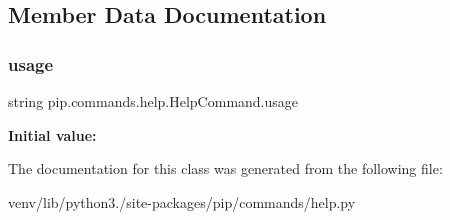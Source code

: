 \subsection{Member Data Documentation}
\mbox{\label{classpip_1_1commands_1_1help_1_1_help_command_a8f5848cbb69a6d341f4f4dd4230f1300}} 
\subsubsection{\texorpdfstring{usage}{usage}}
{\footnotesize\ttfamily string pip.\+commands.\+help.\+Help\+Command.\+usage\hspace{0.3cm}{\ttfamily [static]}}

{\bfseries Initial value\+:}
\begin{DoxyCode}
=  \textcolor{stringliteral}{"""}
\textcolor{stringliteral}{  %
\end{DoxyCode}


The documentation for this class was generated from the following file\+:\begin{DoxyCompactItemize}
\item 
venv/lib/python3./site-\/packages/pip/commands/help.\+py\end{DoxyCompactItemize}
